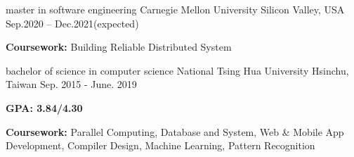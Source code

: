 


\begin{cventries}


\cventry
{master in software engineering} %
{Carnegie Mellon University} %
{Silicon Valley, USA} %
{Sep.2020 -- Dec.2021(expected)} %
{ %
\begin{cvitems}
\item {\textbf{Coursework:} Building Reliable Distributed System}
\end{cvitems}
}




\cventry
{bachelor of science in computer science} %
{National Tsing Hua University} %
{Hsinchu, Taiwan} %
{Sep. 2015 - June. 2019} %
{ %
\begin{cvitems}
\item \textbf{{GPA: 3.84/4.30}}
\item {\textbf{Coursework:} Parallel Computing, Database and System, Web \& Mobile App Development, Compiler Design, Machine Learning, Pattern Recognition}
\end{cvitems}
}

\end{cventries}